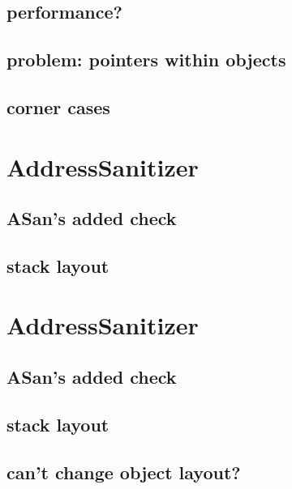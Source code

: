 \subsection{performance?}


\subsection{problem: pointers within objects}


\subsection{corner cases}


\section{AddressSanitizer}


\subsection{ASan's added check}


\subsection{stack layout}




\section{AddressSanitizer}


\subsection{ASan's added check}


\subsection{stack layout}


\subsection{can't change object layout?}


